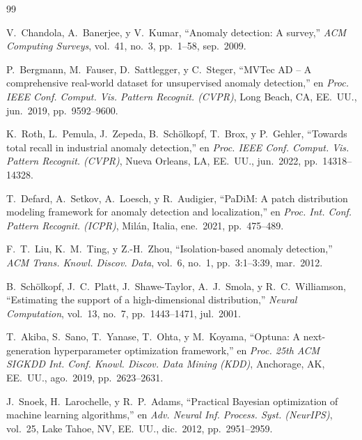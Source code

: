 \documentclass[conference]{IEEEtran}
\begin{document}

\begin{thebibliography}{99}

V.~Chandola, A.~Banerjee, y V.~Kumar,
``Anomaly detection: A survey,''
\emph{ACM Computing Surveys}, vol.~41, no.~3, pp.~1--58, sep.~2009.

P.~Bergmann, M.~Fauser, D.~Sattlegger, y C.~Steger,
``MVTec AD -- A comprehensive real-world dataset for unsupervised anomaly
  detection,''
en \emph{Proc. IEEE Conf. Comput. Vis. Pattern Recognit. (CVPR)},
Long Beach, CA, EE.~UU., jun.~2019, pp.~9592--9600.

K.~Roth, L.~Pemula, J.~Zepeda, B.~Schölkopf, T.~Brox, y P.~Gehler,
``Towards total recall in industrial anomaly detection,''
en \emph{Proc. IEEE Conf. Comput. Vis. Pattern Recognit. (CVPR)},
Nueva Orleans, LA, EE.~UU., jun.~2022, pp.~14318--14328.

T.~Defard, A.~Setkov, A.~Loesch, y R.~Audigier,
``PaDiM: A patch distribution modeling framework for anomaly detection and
  localization,''
en \emph{Proc. Int. Conf. Pattern Recognit. (ICPR)},
Milán, Italia, ene.~2021, pp.~475--489.

F.~T.~Liu, K.~M.~Ting, y Z.-H.~Zhou,
``Isolation-based anomaly detection,''
\emph{ACM Trans. Knowl. Discov. Data}, vol.~6, no.~1, pp.~3:1--3:39, mar.~2012.

B.~Schölkopf, J.~C.~Platt, J.~Shawe-Taylor, A.~J.~Smola,
y R.~C.~Williamson,
``Estimating the support of a high-dimensional distribution,''
\emph{Neural Computation}, vol.~13, no.~7, pp.~1443--1471, jul.~2001.

T.~Akiba, S.~Sano, T.~Yanase, T.~Ohta, y M.~Koyama,
``Optuna: A next-generation hyperparameter optimization framework,''
en \emph{Proc. 25th ACM SIGKDD Int. Conf. Knowl. Discov. Data Mining
  (KDD)}, Anchorage, AK, EE.~UU., ago.~2019, pp.~2623--2631.

J.~Snoek, H.~Larochelle, y R.~P.~Adams,
``Practical Bayesian optimization of machine learning algorithms,''
en \emph{Adv. Neural Inf. Process. Syst. (NeurIPS)}, vol.~25,
Lake Tahoe, NV, EE.~UU., dic.~2012, pp.~2951--2959.


\end{thebibliography}
\end{document}

